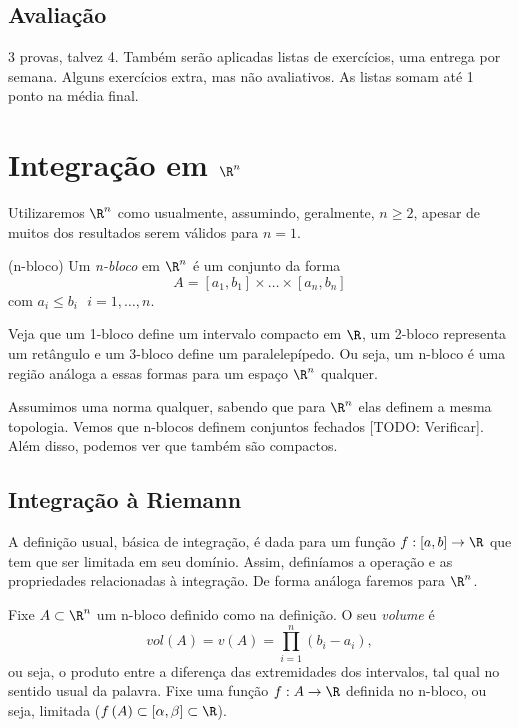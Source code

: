 \subsection*{Avaliação}

3 provas, talvez 4. Também serão aplicadas listas de exercícios, uma entrega por semana. Alguns exercícios extra, mas não avaliativos. As listas somam até 1 ponto na média final.

\section*{Integração em $\R^{n}$}

Utilizaremos $\R^{n}$ como usualmente, assumindo, geralmente, $n\ge 2$, apesar de muitos dos resultados serem válidos para $n=1$.

\begin{definition}
    (n-bloco) Um \emph{n-bloco} em $\R^{n}$ é um conjunto da forma \[
    A = \left[ a_1,b_1 \right] \times \ldots\times \left[ a_n, b_n \right] 
    \] com $a_i\le b_i \text{ } i=1,\ldots,n$.
\end{definition}

Veja que um 1-bloco define um intervalo compacto em $\R$, um 2-bloco representa um retângulo e um 3-bloco define um paralelepípedo. Ou seja, um n-bloco é uma região análoga a essas formas para um espaço $\R^{n}$ qualquer.

Assumimos uma norma qualquer, sabendo que para $\R^{n}$ elas definem a mesma topologia. Vemos que n-blocos definem conjuntos fechados [TODO: Verificar]. Além disso, podemos ver que também são compactos.

\subsection*{Integração à Riemann}

A definição usual, básica de integração, é dada para um função $f:[a,b]\to \R$ que tem que ser limitada em seu domínio. Assim, definíamos a operação e as propriedades relacionadas à integração. De forma análoga faremos para $\R^{n}$.

Fixe $A\subset \R^{n}$ um n-bloco definido como na definição. O seu \emph{volume} é \[
vol\left( A \right) =v\left( A \right) = \prod_{i=1}^{n} \left( b_i - a_i \right)  
,\] ou seja, o produto entre a diferença das extremidades dos intervalos, tal qual no sentido usual da palavra. Fixe uma função $f:A\to \R$ definida no n-bloco, ou seja, limitada ($f\left( A \right) \subset \left[ \alpha, \beta \right] \subset \R$).

